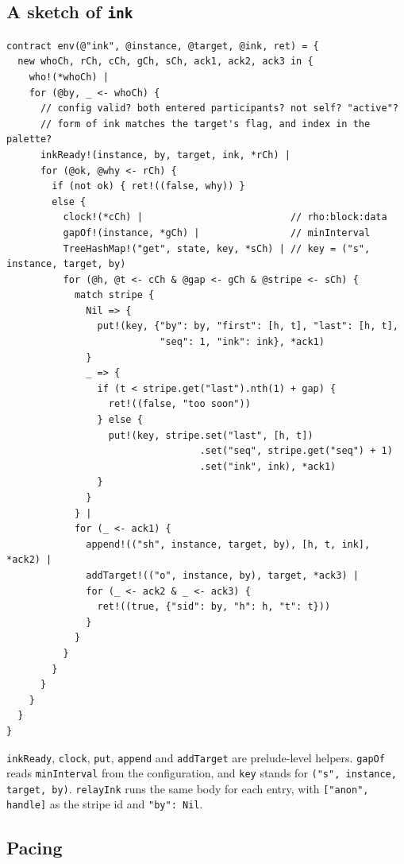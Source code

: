 \documentclass[11pt,a4paper]{article}
\newcommand{\code}[1]{\texttt{#1}}
\begin{document}
\subsection{A sketch of \code{ink}}

\begin{lstlisting}[language=rholang]
contract env(@"ink", @instance, @target, @ink, ret) = {
  new whoCh, rCh, cCh, gCh, sCh, ack1, ack2, ack3 in {
    who!(*whoCh) |
    for (@by, _ <- whoCh) {
      // config valid? both entered participants? not self? "active"?
      // form of ink matches the target's flag, and index in the palette?
      inkReady!(instance, by, target, ink, *rCh) |
      for (@ok, @why <- rCh) {
        if (not ok) { ret!((false, why)) }
        else {
          clock!(*cCh) |                          // rho:block:data
          gapOf!(instance, *gCh) |                // minInterval
          TreeHashMap!("get", state, key, *sCh) | // key = ("s", instance, target, by)
          for (@h, @t <- cCh & @gap <- gCh & @stripe <- sCh) {
            match stripe {
              Nil => {
                put!(key, {"by": by, "first": [h, t], "last": [h, t],
                           "seq": 1, "ink": ink}, *ack1)
              }
              _ => {
                if (t < stripe.get("last").nth(1) + gap) {
                  ret!((false, "too soon"))
                } else {
                  put!(key, stripe.set("last", [h, t])
                                  .set("seq", stripe.get("seq") + 1)
                                  .set("ink", ink), *ack1)
                }
              }
            } |
            for (_ <- ack1) {
              append!(("sh", instance, target, by), [h, t, ink], *ack2) |
              addTarget!(("o", instance, by), target, *ack3) |
              for (_ <- ack2 & _ <- ack3) {
                ret!((true, {"sid": by, "h": h, "t": t}))
              }
            }
          }
        }
      }
    }
  }
}
\end{lstlisting}

\code{inkReady}, \code{clock}, \code{put}, \code{append} and \code{addTarget} are prelude-level
helpers. \code{gapOf} reads \code{minInterval} from the configuration, and \code{key} stands
for \code{("s", instance, target, by)}.
\code{relayInk} runs the same body for each entry, with \code{["anon", handle]} as the stripe id
and \code{"by": Nil}.

\subsection{Pacing}
\end{document}
